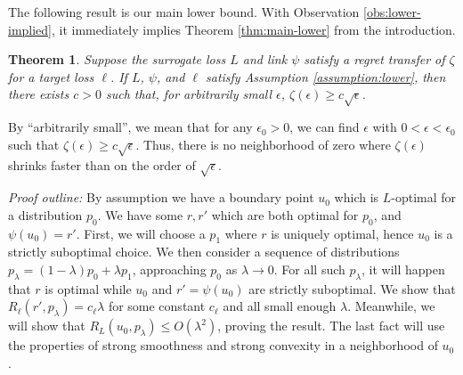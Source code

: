 \documentclass{article}
\newtheorem{theorem}{Theorem}
\theoremstyle{definition}\newtheorem{definition}{Definition}
\theoremstyle{definition}\newtheorem{assumption}{Assumption}
\begin{document}
The following result is our main lower bound.
With Observation \ref{obs:lower-implied}, it immediately implies Theorem \ref{thm:main-lower} from the introduction.
\begin{theorem}
  Suppose the surrogate loss $L$ and link $\psi$ satisfy a regret transfer of $\zeta$ for a target loss $\ell$.
  If $L$, $\psi$, and $\ell$ satisfy Assumption \ref{assumption:lower}, then there exists $c > 0$ such that, for arbitrarily small $\epsilon$, $\zeta(\epsilon) \geq c \sqrt{\epsilon}$.
\end{theorem}
By ``arbitrarily small'', we mean that for any $\epsilon_0 > 0$, we can find $\epsilon$ with $0 < \epsilon < \epsilon_0$ such that $\zeta(\epsilon) \geq c \sqrt{\epsilon}$.
Thus, there is no neighborhood of zero where $\zeta(\epsilon)$ shrinks faster than on the order of $\sqrt{\epsilon}$.

\emph{Proof outline:} By assumption we have a boundary point $u_0$ which is $L$-optimal for a distribution $p_0$.
We have some $r,r'$ which are both optimal for $p_0$, and $\psi(u_0) = r'$.
First, we will choose a $p_1$ where $r$ is uniquely optimal, hence $u_0$ is a strictly suboptimal choice.
We then consider a sequence of distributions $p_{\lambda} = (1-\lambda) p_0 + \lambda p_1$, approaching $p_0$ as $\lambda \to 0$.
For all such $p_{\lambda}$, it will happen that $r$ is optimal while $u_0$ and $r' = \psi(u_0)$ are strictly suboptimal.
We show that $R_{\ell}(r', p_{\lambda}) = c_{\ell} \lambda$ for some constant $c_{\ell}$ and all small enough $\lambda$.
Meanwhile, we will show that $R_L(u_0, p_{\lambda}) \leq O(\lambda^2)$, proving the result.
The last fact will use the properties of strong smoothness and strong convexity in a neighborhood of $u_0$.
\end{document}
